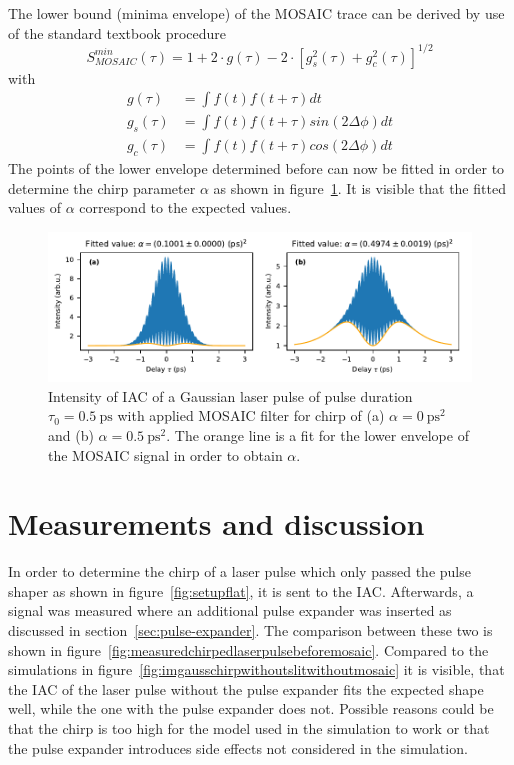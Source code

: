 The lower bound (minima envelope) of the MOSAIC trace can be derived by use of the standard textbook procedure~\cite{klein_optics_1986}
\begin{equation}
S^{min}_{MOSAIC}(\tau)= 1 + 2 \cdot g(\tau) - 2 \cdot [g_s^2(\tau)+g_c^2(\tau)]^{1/2}
\end{equation}
with 
\begin{align}
g(\tau)&=\int f(t)f(t+\tau)dt\\
g_s(\tau)&=\int f(t)f(t+\tau)sin(2\Delta\phi)dt\\
g_c(\tau)&=\int f(t)f(t+\tau)cos(2\Delta\phi)dt
\end{align}
The points of the lower envelope determined before can now be fitted in order to determine the chirp parameter $\alpha$ as shown in figure~\ref{fig:mosaicchirpedlaserpulsefitenvelope}.
It is visible that the fitted values of $\alpha$ correspond to the expected values.
\begin{figure}[H]
	\centering
	\includegraphics[width=\linewidth]{figures/chirp/plots/mosaic_chirped_laser_pulse_fit_envelope}
	\caption{Intensity of IAC of a Gaussian laser pulse of pulse duration $\tau_0=\SI{0.5}{\pico \second}$ with applied MOSAIC filter for chirp of (a) $\alpha = \SI{0}{\pico \second \squared}$ and (b) $\alpha = \SI{0.5}{\pico \second \squared}$.
	The orange line is a fit for the lower envelope of the MOSAIC signal in order to obtain $\alpha$.}
	\label{fig:mosaicchirpedlaserpulsefitenvelope}
\end{figure}

\section{Measurements and discussion}

In order to determine the chirp of a laser pulse which only passed the pulse shaper as shown in figure~\ref{fig:setupflat}, it is sent to the \ac{IAC}.
Afterwards, a signal was measured where an additional pulse expander was inserted as discussed in section~\ref{sec:pulse-expander}.
The comparison between these two is shown in figure~\ref{fig:measuredchirpedlaserpulsebeforemosaic}.
Compared to the simulations in figure~\ref{fig:imgausschirpwithoutslitwithoutmosaic} it is visible, that the IAC of the laser pulse without the pulse expander fits the expected shape well, while the one with the pulse expander does not.
Possible reasons could be that the chirp is too high for the model used in the simulation to work or that the pulse expander introduces side effects not considered in the simulation.

